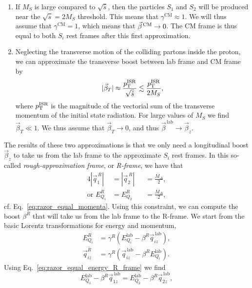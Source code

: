 \begin{enumerate}
  \item If $M_S$ is large compared to $\sqrt{\hat{s}}$, then the particles $S_1$ and $S_2$ will be
produced near the $\sqrt{\hat{s}} = 2 M_S$ threshold. This means that $\gamma^{\textrm{CM}} \approx
1$. We will thus assume that $\gamma^{\textrm{CM}} = 1$, which means that $\vec{\beta}^{\,\textrm{CM}} \rightarrow 0$. 
The CM frame is thus equal to both $S_i$ rest frames after this first approximation. 
  \item Neglecting the transverse motion of the colliding partons inside the proton, we can
approximate the transverse boost between lab frame and CM frame by 
  \begin{equation}
    |\vec{\beta}_T| \approx \frac{p_{\mathrm{T}}^{\rm ISR}}{\sqrt{\hat{s}}} \lesssim \frac{p_{\mathrm{T}}^{\rm
ISR}}{2M_S},
  \end{equation}
  where $p_{\mathrm{T}}^{\rm ISR}$ is the magnitude of the vectorial sum of the transverse momentum of the
initial state radiation. For large values of $M_S$ we find $\vec{\beta}_T \ll 1$. We thus assume
that $\vec{\beta}_T \rightarrow 0$, and thus $\vec{\beta}^{\,\textrm{lab}} \rightarrow
\vec{\beta}_z$.
\end{enumerate}
The results of these two approximations is that we only need a longitudinal boost $\vec{\beta}_z$
to take us from the lab frame to the approximate $S_i$ rest frames. 
In this so-called \textit{rough-approximation frame}, or \textit{R-frame}, we have that
\begin{alignat}{4}
  |\vec{q}^{\,R}_1|         &= |\vec{q}^{\,R}_2| &&= \frac{M_\Delta}{2} , \\
  \textrm{or } E_{Q_1}^R &= E_{Q_2}^R     &&= \frac{M_\Delta}{2},
\label{eq:razor_equal_energy_R_frame}
\end{alignat}
cf. Eq.~\ref{eq:razor_equal_momenta}. Using this constraint, we can compute the boost $\beta^R$
that will take us from the lab frame to the R-frame. We start from the basic Lorentz
transformations for energy and momentum, 
\begin{align}
  E_{Q_i}^R      &= \gamma^R \left( E_{Q_i}^{\textrm{lab}} - \beta^R \vec{q}_{iz}^{\,\textrm{lab}}
\right) , \\
  \vec{q}_{iz}^R &= \gamma^R \left( \vec{q}_{iz}^{\,\textrm{lab}} - \beta^R E_{Q_i}^{\textrm{lab}}
\right) .
\end{align}
Using Eq.~\ref{eq:razor_equal_energy_R_frame} we find
\begin{equation}
  E_{Q_1}^{\textrm{lab}} - \beta^R \vec{q}_{1z}^{\,\textrm{lab}} = E_{Q_2}^{\textrm{lab}} - \beta^R
\vec{q}_{2z}^{\,\textrm{lab}} ,
\end{equation}
